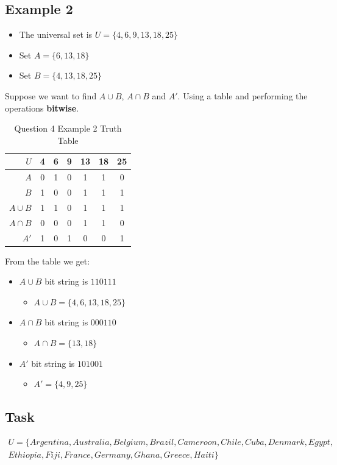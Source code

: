 \documentclass[12pt,a4paper]{article}
\begin{document}
\subsection{Example 2}

\begin{itemize}
\item The universal set is $U = \{4, 6, 9, 13, 18, 25\}$
\item Set $A = \{6, 13, 18\}$
\item Set $B = \{4, 13, 18, 25\}$
\end{itemize}
Suppose we want to find $A \cup B$, $A \cap B$ and $A'$. Using a table and performing the operations \textbf{bitwise}.

\begin{table}[h]
\centering
\caption{Question 4 Example 2 Truth Table}
\begin{tabular}{r|c|c|c|c|c|c}
$U$ & 4 & 6 & 9 & 13 & 18 & 25 \\
\hline
$A$ & 0 & 1 & 0 & 1 & 1 & 0 \\
\hline
$B$ & 1 & 0 & 0 & 1 & 1 & 1 \\
\hline
$A \cup B$ & 1 & 1 & 0 & 1 & 1 & 1 \\
\hline
$A \cap B$ & 0 & 0 & 0 & 1 & 1 & 0 \\
\hline
$A'$ & 1 & 0 & 1 & 0 & 0 & 1 \\
\hline
\end{tabular}
\end{table}
From the table we get:
\begin{itemize}
\item $A \cup B$ bit string is $110111$
	\begin{itemize}
	\item $A \cup B = \{4, 6, 13, 18, 25\}$
	\end{itemize}
\item $A \cap B$ bit string is $000110$
	\begin{itemize}
	\item $A \cap B = \{13, 18\}$
	\end{itemize}
\item $A'$ bit string is $101001$
	\begin{itemize}
	\item $A' = \{4, 9, 25\}$
	\end{itemize}
\end{itemize}

\subsection{Task}
\begin{gather*}
U = \{Argentina, Australia, Belgium, Brazil, Cameroon, Chile, Cuba, Denmark, Egypt, 
\\Ethiopia, Fiji, France, Germany, Ghana, Greece, Haiti\}
\end{gather*}
\end{document}
